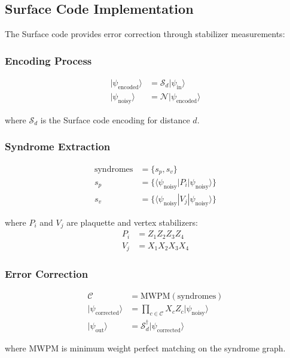 \documentclass{article}
\begin{document}
\subsection{Surface Code Implementation}
The Surface code provides error correction through stabilizer measurements:

\subsubsection{Encoding Process}
\begin{align*}
|\psi_{\text{encoded}}\rangle &= \mathcal{S}_d|\psi_{\text{in}}\rangle \\
|\psi_{\text{noisy}}\rangle &= \mathcal{N}|\psi_{\text{encoded}}\rangle
\end{align*}

where $\mathcal{S}_d$ is the Surface code encoding for distance $d$.

\subsubsection{Syndrome Extraction}
\begin{align*}
\text{syndromes} &= \{s_p, s_v\} \\
s_p &= \{\langle \psi_{\text{noisy}}|P_i|\psi_{\text{noisy}}\rangle\} \\
s_v &= \{\langle \psi_{\text{noisy}}|V_j|\psi_{\text{noisy}}\rangle\}
\end{align*}

where $P_i$ and $V_j$ are plaquette and vertex stabilizers:
\begin{align*}
P_i &= Z_1Z_2Z_3Z_4 \\
V_j &= X_1X_2X_3X_4
\end{align*}

\subsubsection{Error Correction}
\begin{align*}
\mathcal{C} &= \text{MWPM}(\text{syndromes}) \\
|\psi_{\text{corrected}}\rangle &= \prod_{c \in \mathcal{C}} X_c Z_c |\psi_{\text{noisy}}\rangle \\
|\psi_{\text{out}}\rangle &= \mathcal{S}_d^\dagger|\psi_{\text{corrected}}\rangle
\end{align*}

where MWPM is minimum weight perfect matching on the syndrome graph.
\end{document}

